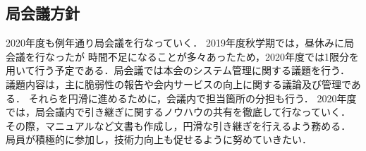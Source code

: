 \subsection*{局会議方針}


 2020年度も例年通り局会議を行なっていく．
 2019年度秋学期では，昼休みに局会議を行なったが
 時間不足になることが多々あったため，2020年度では1限分を
 用いて行う予定である．局会議では本会のシステム管理に関する議題を行う．
 議題内容は，主に脆弱性の報告や会内サービスの向上に関する議論及び管理である．
 それらを円滑に進めるために，会議内で担当箇所の分担も行う．
 2020年度では，局会議内で引き継ぎに関するノウハウの共有を徹底して行なっていく．
 その際，マニュアルなど文書も作成し，円滑な引き継ぎを行えるよう務める．
 局員が積極的に参加し，技術力向上も促せるように努めていきたい．
